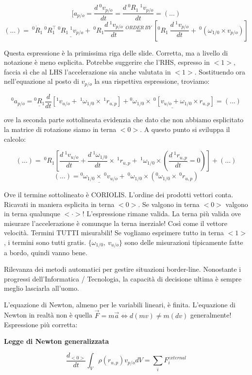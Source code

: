 \[
	[a_{p/o} = \frac{d\ ^0v_{p/o}}{dt} = \frac{d\ ^0R_1\ ^1v_{p/o}}{dt} = (\dots)
\]
\[
	(\dots) =\ ^0\dot{R}_1\ ^0R_1^\top\ \underline{^0R_1\ ^1v_{p/o}} +\ ^0R_1\frac{d\ ^1v_{p/o}}{dt} \stackrel{ORDER\ BY}{=} [^0R_1\ \frac{d\ ^1v_{p/o}}{dt} +\ ^0(\omega_{1/0}\times v_{p/o})]
\]

Questa espressione è la primissima riga delle slide. Corretta, ma a livello di notazione è meno esplicita. Potrebbe suggerire che l'RHS, espresso in $<1>$, faccia sì che al LHS l'accelerazione sia anche valutata in $<1>$. Sostituendo ora nell'equazione al posto di $v_{p/o}$ la sua rispettiva espressione, troviamo:

\[
	^0a_{p/o} = \underline{^0R_1}\frac{d}{dt}[^1v_{u/o} +\ ^1\omega_{1/0}\times\ ^1r_{u,p}] + \underline{^0\omega_{1/0}\times\ ^0[v_{u/o} + \omega_{1/0}\times r_{u,p}]} = (\dots)
\]

ove la seconda parte sottolineata evidenzia che dato che non abbiamo esplicitato la matrice di rotazione siamo in terna $<0>$. A questo punto si sviluppa il calcolo:

\[
	(\dots) =\ ^0R_1[\frac{d\ ^1v_{u/o}}{dt} + \frac{d\ ^1\omega_{1/0}}{dt}\times\ ^1r_{u,p} +\ ^1\omega_{1/0}\times (\frac{d\ ^1r_{u,p}}{dt}=0)] + (\dots)
\]
\[
	(\dots) = \underline{^0\omega_{1/0}\times\ ^0v_{u/o}} +\ ^0\omega_{1/0}\times (^0\omega_{1/0}\times\ ^0r_{u,p})
\]

Ove il termine sottolineato è CORIOLIS. L'ordine dei prodotti vettori conta. Ricavati in maniera esplicita in terna $<0>$. Se valgono in terna $<0>$ valgono in terna qualunque $<\mathord{\cdot}>$! L'espressione rimane valida. La terna più valida ove misurare l'accelerazione è comunque la terna inerziale! Così come il vettore velocità. Termini TUTTI misurabili! Se vogliamo esprimere tutto in terna $<1>$, i termini sono tutti gratis. $\{\omega_{1/0},\ v_{u/o}\}$ sono delle misurazioni tipicamente fatte a bordo, quindi vanno bene.

Rilevanza dei metodi automatici per gestire situazioni border-line. Nonostante i progressi dell'Informatica / Tecnologia, la capacità di decisione ultima è sempre meglio lasciarla all'uomo.

L'equazione di Newton, almeno per le variabili lineari, è finita. L'equazione di Newton in realtà non è quella $\vec{F}=m\vec{a}\iff d(mv) \neq m(dv)$ generalmente! Espressione più corretta:

\begin{defn}{\textbf{Legge di Newton generalizzata}}

\[	
	\frac{d_{<0>}}{dt}\int_V{\rho(r_{u,p})v_{p/o}dV} = \sum_i{F_i^{external}}
\]

\end{defn}

